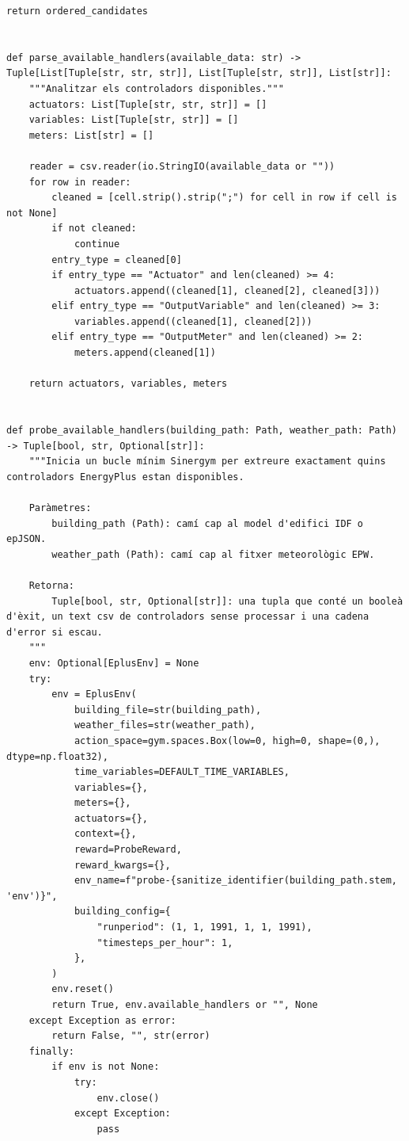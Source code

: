 \documentclass[10pt,a4paper]{article}
\begin{document}
\begin{lstlisting}[style=studioPython,caption={backend/afegir\_entorn\_analysis.py},label={lst:backend-afegir-entorn-analysis-py}]
    return ordered_candidates


def parse_available_handlers(available_data: str) -> Tuple[List[Tuple[str, str, str]], List[Tuple[str, str]], List[str]]:
    """Analitzar els controladors disponibles."""
    actuators: List[Tuple[str, str, str]] = []
    variables: List[Tuple[str, str]] = []
    meters: List[str] = []

    reader = csv.reader(io.StringIO(available_data or ""))
    for row in reader:
        cleaned = [cell.strip().strip(";") for cell in row if cell is not None]
        if not cleaned:
            continue
        entry_type = cleaned[0]
        if entry_type == "Actuator" and len(cleaned) >= 4:
            actuators.append((cleaned[1], cleaned[2], cleaned[3]))
        elif entry_type == "OutputVariable" and len(cleaned) >= 3:
            variables.append((cleaned[1], cleaned[2]))
        elif entry_type == "OutputMeter" and len(cleaned) >= 2:
            meters.append(cleaned[1])

    return actuators, variables, meters


def probe_available_handlers(building_path: Path, weather_path: Path) -> Tuple[bool, str, Optional[str]]:
    """Inicia un bucle mínim Sinergym per extreure exactament quins controladors EnergyPlus estan disponibles.

    Paràmetres:
        building_path (Path): camí cap al model d'edifici IDF o epJSON.
        weather_path (Path): camí cap al fitxer meteorològic EPW.

    Retorna:
        Tuple[bool, str, Optional[str]]: una tupla que conté un booleà d'èxit, un text csv de controladors sense processar i una cadena d'error si escau.
    """
    env: Optional[EplusEnv] = None
    try:
        env = EplusEnv(
            building_file=str(building_path),
            weather_files=str(weather_path),
            action_space=gym.spaces.Box(low=0, high=0, shape=(0,), dtype=np.float32),
            time_variables=DEFAULT_TIME_VARIABLES,
            variables={},
            meters={},
            actuators={},
            context={},
            reward=ProbeReward,
            reward_kwargs={},
            env_name=f"probe-{sanitize_identifier(building_path.stem, 'env')}",
            building_config={
                "runperiod": (1, 1, 1991, 1, 1, 1991),
                "timesteps_per_hour": 1,
            },
        )
        env.reset()
        return True, env.available_handlers or "", None
    except Exception as error:
        return False, "", str(error)
    finally:
        if env is not None:
            try:
                env.close()
            except Exception:
                pass



\end{lstlisting}
\end{document}
